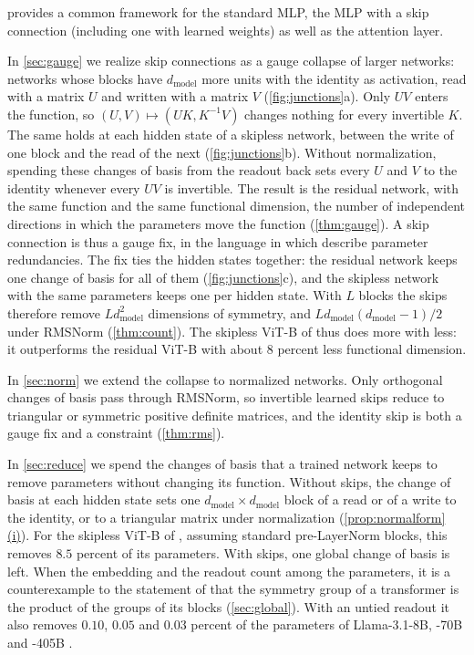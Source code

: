 \documentclass[10pt]{article}
\theoremstyle{definition}
\theoremstyle{remark}
\newcommand{\dm}{d_{\mathrm{model}}}
\DeclareRobustCommand{\cpref}[2]{\hyperref[#1:#2]{\cref*{#1}(#2)}}
\begin{document}
 provides a common framework for the standard MLP, the MLP with a skip connection (including one with learned weights) as well as the attention layer.

In \cref{sec:gauge} we realize skip connections as a gauge collapse of larger networks: networks whose blocks have $\dm$ more units with the identity as activation, read with a matrix $U$ and written with a matrix $V$ (\cref{fig:junctions}a). Only $UV$ enters the function, so $(U, V) \mapsto (UK, K^{-1}V)$ changes nothing for every invertible $K$. The same holds at each hidden state of a skipless network, between the write of one block and the read of the next (\cref{fig:junctions}b). Without normalization, spending these changes of basis from the readout back sets every $U$ and $V$ to the identity whenever every $UV$ is invertible. The result is the residual network, with the same function and the same functional dimension, the number of independent directions in which the parameters move the function \citep{grigsby2022functional} (\cref{thm:gauge}). A skip connection is thus a gauge fix, in the language in which \citet{hashimoto2024unification} describe parameter redundancies. The fix ties the hidden states together: the residual network keeps one change of basis for all of them (\cref{fig:junctions}c), and the skipless network with the same parameters keeps one per hidden state. With $L$ blocks the skips therefore remove $L\dm^2$ dimensions of symmetry, and $L\dm(\dm-1)/2$ under RMSNorm (\cref{thm:count}). The skipless ViT-B of \citet{ji2026cutting} thus does more with less: it outperforms the residual ViT-B with about $8$ percent less functional dimension.

In \cref{sec:norm} we extend the collapse to normalized networks. Only orthogonal changes of basis pass through RMSNorm, so invertible learned skips reduce to triangular or symmetric positive definite matrices, and the identity skip is both a gauge fix and a constraint (\cref{thm:rms}).

In \cref{sec:reduce} we spend the changes of basis that a trained network keeps to remove parameters without changing its function. Without skips, the change of basis at each hidden state sets one $\dm\times\dm$ block of a read or of a write to the identity, or to a triangular matrix under normalization (\cpref{prop:normalform}{i}). For the skipless ViT-B of \citet{ji2026cutting}, assuming standard pre-LayerNorm blocks, this removes $8.5$ percent of its parameters. With skips, one global change of basis is left. When the embedding and the readout count among the parameters, it is a counterexample to the statement of \citet{wang2025gauge} that the symmetry group of a transformer is the product of the groups of its blocks (\cref{sec:global}). With an untied readout it also removes $0.10$, $0.05$ and $0.03$ percent of the parameters of Llama-3.1-8B, -70B and -405B \citep{grattafiori2024llama3}.
\end{document}
